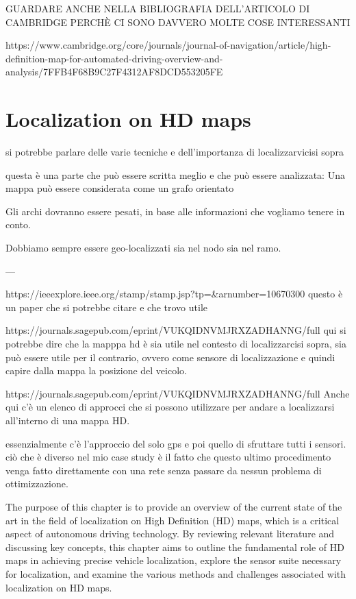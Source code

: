 GUARDARE ANCHE NELLA BIBLIOGRAFIA DELL'ARTICOLO DI CAMBRIDGE PERCHÈ CI SONO DAVVERO MOLTE COSE INTERESSANTI

https://www.cambridge.org/core/journals/journal-of-navigation/article/high-definition-map-for-automated-driving-overview-and-analysis/7FFB4F68B9C27F4312AF8DCD553205FE



\section{Localization on HD maps}

si potrebbe parlare delle varie tecniche e dell'importanza di localizzarvicisi sopra

questa è una parte che può essere scritta meglio e che può essere analizzata: Una mappa può essere considerata come un grafo orientato 

Gli archi dovranno essere pesati, in base alle informazioni che vogliamo tenere in conto. 

Dobbiamo sempre essere geo-localizzati sia nel nodo sia nel ramo.

---


https://ieeexplore.ieee.org/stamp/stamp.jsp?tp=&arnumber=10670300
questo è un paper che si potrebbe citare e che trovo utile 


https://journals.sagepub.com/eprint/VUKQIDNVMJRXZADHANNG/full
qui si potrebbe dire che la mapppa hd è sia utile nel contesto di localizzarcisi sopra, sia può essere utile per il contrario, ovvero come sensore di localizzazione e quindi capire dalla mappa la posizione del veicolo. 


https://journals.sagepub.com/eprint/VUKQIDNVMJRXZADHANNG/full
Anche qui c'è un elenco di approcci che si possono utilizzare per andare a localizzarsi all'interno di una mappa HD.

essenzialmente c'è l'approccio del solo gps e poi quello di sfruttare tutti i sensori. ciò che è diverso nel mio case study è il fatto che questo ultimo procedimento venga fatto direttamente con una rete senza passare da nessun problema di ottimizzazione.



The purpose of this chapter is to provide an overview of the current state of the art in the field of localization on High Definition (HD) maps, which is a critical aspect of autonomous driving technology. By reviewing relevant literature and discussing key concepts, this chapter aims to outline the fundamental role of HD maps in achieving precise vehicle localization, explore the sensor suite necessary for localization, and examine the various methods and challenges associated with localization on HD maps.

